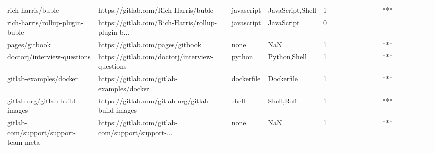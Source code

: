 \begin{tabular}{llllrlllllllllllll}
rich-harris/buble                                  &               https://gitlab.com/Rich-Harris/buble &        javascript &                                   JavaScript,Shell &       1 &         &        &           &                &                 &        &           &       *** &          &          &       &              &          \\
rich-harris/rollup-plugin-buble                    &  https://gitlab.com/Rich-Harris/rollup-plugin-b... &        javascript &                                         JavaScript &       0 &         &        &           &                &                 &        &           &           &          &          &       &              &          \\
pages/gitbook                                      &                   https://gitlab.com/pages/gitbook &              none &                                                NaN &       1 &         &        &           &                &                 &        &           &       *** &          &          &       &              &          \\
doctorj/interview-questions                        &     https://gitlab.com/doctorj/interview-questions &            python &                                       Python,Shell &       1 &         &        &           &                &                 &        &           &       *** &          &          &       &              &          \\
gitlab-examples/docker                             &          https://gitlab.com/gitlab-examples/docker &        dockerfile &                                         Dockerfile &       1 &         &        &           &                &                 &        &           &       *** &          &          &       &              &          \\
gitlab-org/gitlab-build-images                     &  https://gitlab.com/gitlab-org/gitlab-build-images &             shell &                                         Shell,Roff &       1 &         &        &           &                &                 &        &           &       *** &          &          &       &              &          \\
gitlab-com/support/support-team-meta               &  https://gitlab.com/gitlab-com/support/support-... &              none &                                                NaN &       1 &         &        &           &                &                 &        &           &       *** &          &          &       &              &          \\

\end{tabular}

